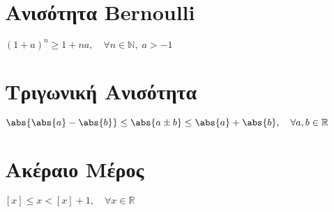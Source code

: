 \documentclass[a4paper,table]{report}
\begin{document}
{    \section{Ανισότητα Bernoulli}
    \begin{myitemize}
      \item $(1+a)^{n} \geq 1+ na, \quad \forall n \in \mathbb{N}, \; a>-1 $
    \end{myitemize}
    \section{Τριγωνική Ανισότητα}
    \begin{myitemize}
      \item $ \abs{\abs{a} - \abs{b}} \leq \abs{a \pm b} \leq \abs{a} + \abs{b}, \quad 
        \forall a,b \in \mathbb{R} $
    \end{myitemize}
    \section{Ακέραιο Μέρος}
    \begin{myitemize}
      \item $ [x] \leq x < [x]+1, \quad \forall x \in \mathbb{R} $ 
    \end{myitemize}
  }
\end{document}
